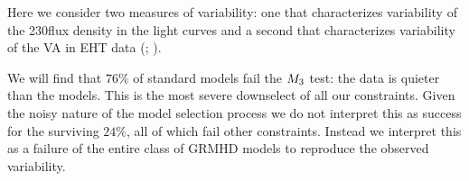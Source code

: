 Here we consider two measures of variability: one that characterizes variability of the 230\GHz flux density in the light curves \citep{Wielgus2022} and a second that characterizes variability of the VA in EHT data (; \citealt{NoiseModeling}).

We will find that $76\%$ of standard models fail the $M_{3}$ test: the data is quieter than the models.  This is the most severe downselect of all our constraints. Given the noisy nature of the model selection process we do not interpret this as success for the surviving $24\%$, all of which fail other constraints.  Instead we interpret this as a failure of the entire class of GRMHD models to reproduce the observed variability.  




